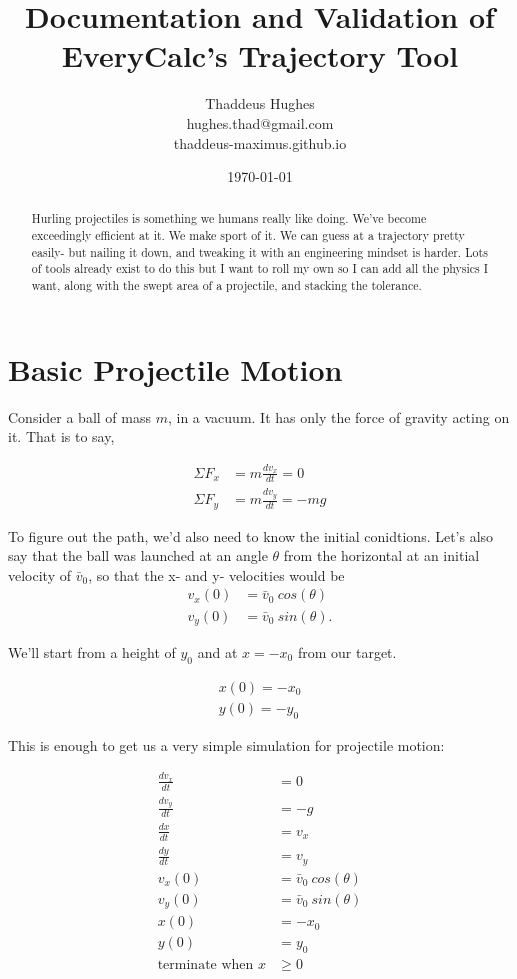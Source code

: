 \documentclass[10pt,letterpaper]{article}
\author{Thaddeus Hughes \\ hughes.thad@gmail.com \\ thaddeus-maximus.github.io}
\date{\today}
\title{Documentation and Validation of EveryCalc's Trajectory Tool}
\begin{document}
	\maketitle
	
	\begin{abstract}
		Hurling projectiles is something we humans really like doing. We've become exceedingly efficient at it. We make sport of it. We can guess at a trajectory pretty easily- but nailing it down, and tweaking it with an engineering mindset is harder. Lots of tools already exist to do this but I want to roll my own so I can add all the physics I want, along with the swept area of a projectile, and stacking the tolerance.
	\end{abstract}
	
\section{Basic Projectile Motion}
	Consider a ball of mass $m$, in a vacuum. It has only the force of gravity acting on it. That is to say,

	\begin{align}
		\Sigma F_x &= m \frac{d v_x}{d t} = 0 \\
		\Sigma F_y &= m \frac{d v_y}{d t} = - m g
	\end{align}

	To figure out the path, we'd also need to know the initial conidtions. Let's also say that the ball was launched at an angle $\theta$ from the horizontal at an initial velocity of $\bar{v}_0$, so that the x- and y- velocities would be
	\begin{align}
		v_x(0) &= \bar{v}_0 \ cos(\theta) \\
		v_y(0) &= \bar{v}_0 \ sin(\theta) .
	\end{align}

	We'll start from a height of $y_0$ and at $x=-x_0$ from our target.

	\begin{align}
		x(0) = -x_0 \\
		y(0) = -y_0 
	\end{align}

	This is enough to get us a very simple simulation for projectile motion:

	\begin{align}
		\frac{d v_x}{d t} &= 0 \\
		\frac{d v_y}{d t} &= - g \\
		\frac{d x}{d t} &= v_x \\
		\frac{d y}{d t} &= v_y \\
		v_x(0) &= \bar{v}_0 \ cos(\theta) \\
		v_y(0) &= \bar{v}_0 \ sin(\theta) \\
		x(0) &= -x_0 \\
		y(0) &= y_0 \\
		\text{terminate when } x &\geq 0
	\end{align}
\end{document}
